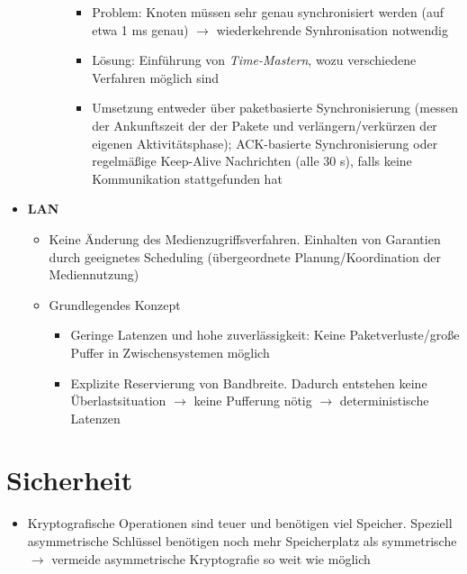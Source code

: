 \begin{itemize}
\begin{itemize}
\begin{itemize}
			\begin{itemize}
				\item Problem: Knoten müssen sehr genau synchronisiert werden (auf etwa 1 ms genau) \(\rightarrow\) wiederkehrende Synhronisation notwendig
				\item Lösung: Einführung von \textit{Time-Mastern}, wozu verschiedene Verfahren möglich sind
				\item Umsetzung entweder über paketbasierte Synchronisierung (messen der Ankunftszeit der der Pakete und verlängern/verkürzen der eigenen Aktivitätsphase); ACK-basierte Synchronisierung oder regelmäßige Keep-Alive Nachrichten (alle 30 s), falls keine Kommunikation stattgefunden hat
			\end{itemize}
		\end{itemize}
	\end{itemize}
	\item \textbf{LAN}
	\begin{itemize}
		\item Keine Änderung des Medienzugriffsverfahren. Einhalten von Garantien durch geeignetes Scheduling (übergeordnete Planung/Koordination der Mediennutzung)
		\item Grundlegendes Konzept
		\begin{itemize}
			\item Geringe Latenzen und hohe zuverlässigkeit: Keine Paketverluste/große Puffer in Zwischensystemen möglich
			\item Explizite Reservierung von Bandbreite. Dadurch entstehen keine Überlastsituation \(\rightarrow\) keine Pufferung nötig \(\rightarrow\) deterministische Latenzen
		\end{itemize}
	\end{itemize}
\end{itemize}


\section{Sicherheit}
\begin{itemize}
	\item Kryptografische Operationen sind teuer und benötigen viel Speicher. Speziell asymmetrische Schlüssel benötigen noch mehr Speicherplatz als symmetrische \(\rightarrow\) vermeide asymmetrische Kryptografie so weit wie möglich
\end{itemize}

